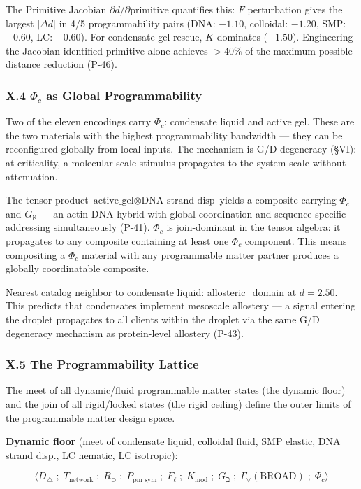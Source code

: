 \documentclass[12pt,a4paper]{article}
\begin{document}
The Primitive Jacobian $\partial d / \partial \text{primitive}$ quantifies this: $F$ perturbation gives the largest $|\Delta d|$ in 4/5 programmability pairs (DNA: $-1.10$, colloidal: $-1.20$, SMP: $-0.60$, LC: $-0.60$). For condensate gel rescue, $K$ dominates ($-1.50$). Engineering the Jacobian-identified primitive alone achieves $> 40\%$ of the maximum possible distance reduction (P-46).

\subsubsection{X.4 $\Phi_c$ as Global Programmability}

Two of the eleven encodings carry $\Phi_c$: condensate liquid and active gel. These are the two materials with the highest programmability bandwidth --- they can be reconfigured globally from local inputs. The mechanism is G/D degeneracy (§VI): at criticality, a molecular-scale stimulus propagates to the system scale without attenuation.

The tensor product $\text{active\_gel} \otimes \text{DNA strand disp}$ yields a composite carrying $\Phi_c$ and $G_\aleph$ --- an actin-DNA hybrid with global coordination and sequence-specific addressing simultaneously (P-41). $\Phi_c$ is join-dominant in the tensor algebra: it propagates to any composite containing at least one $\Phi_c$ component. This means compositing a $\Phi_c$ material with any programmable matter partner produces a globally coordinatable composite.

Nearest catalog neighbor to condensate liquid: allosteric\_domain at $d = 2.50$. This predicts that condensates implement mesoscale allostery --- a signal entering the droplet propagates to all clients within the droplet via the same G/D degeneracy mechanism as protein-level allostery (P-43).

\subsubsection{X.5 The Programmability Lattice}

The meet of all dynamic/fluid programmable matter states (the dynamic floor) and the join of all rigid/locked states (the rigid ceiling) define the outer limits of the programmable matter design space.

\textbf{Dynamic floor} (meet of condensate liquid, colloidal fluid, SMP elastic, DNA strand disp., LC nematic, LC isotropic):

\[\langle D_\triangle \;;\; T_\text{network} \;;\; R_{\supseteq} \;;\; P_{\text{pm\_sym}} \;;\; F_\ell \;;\; K_\text{mod} \;;\; G_\beth \;;\; \Gamma_\vee(\text{BROAD}) \;;\; \Phi_c \rangle\]
\end{document}
